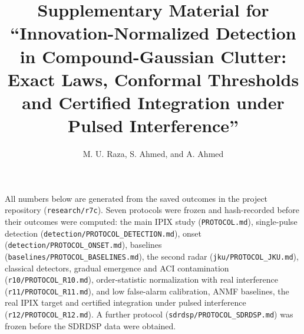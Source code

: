 \documentclass[10pt]{article}
\title{Supplementary Material for ``Innovation-Normalized Detection in Compound-Gaussian Clutter: Exact Laws, Conformal Thresholds and Certified Integration under Pulsed Interference''}
\author{M. U. Raza, S. Ahmed, and A. Ahmed}
\date{}
\begin{document}
\maketitle
\noindent All numbers below are generated from the saved outcomes in the project repository (\texttt{research/r7c}). Seven protocols were frozen and hash-recorded before their outcomes were computed: the main IPIX study (\texttt{PROTOCOL.md}), single-pulse detection (\texttt{detection/PROTOCOL\_DETECTION.md}), onset (\texttt{detection/PROTOCOL\_ONSET.md}), baselines (\texttt{baselines/PROTOCOL\_BASELINES.md}), the second radar (\texttt{jku/PROTOCOL\_JKU.md}), classical detectors, gradual emergence and ACI contamination (\texttt{r10/PROTOCOL\_R10.md}), order-statistic normalization with real interference (\texttt{r11/PROTOCOL\_R11.md}), and low false-alarm calibration, ANMF baselines, the real IPIX target and certified integration under pulsed interference (\texttt{r12/PROTOCOL\_R12.md}). A further protocol (\texttt{sdrdsp/PROTOCOL\_SDRDSP.md}) was frozen before the SDRDSP data were obtained.
\end{document}
